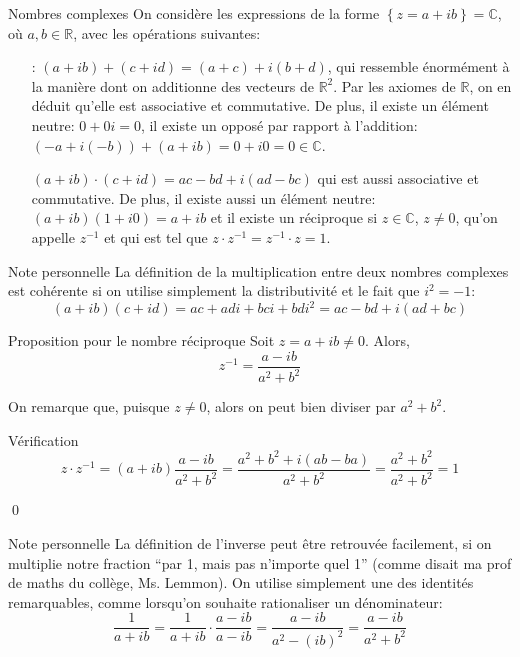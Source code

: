 \documentclass{article}
\begin{document}
\begin{parag}{Nombres complexes}
    On considère les expressions de la forme $\left\{z = a + ib\right\} = \mathbb{C}$, où $a, b \in \mathbb{R}$, avec les opérations suivantes:
    \begin{itemize}
        \item[\important{+} :] $\left(a + ib\right) + \left(c + id\right) = \left(a + c\right) + i\left(b + d\right)$, qui ressemble énormément à la manière dont on additionne des vecteurs de $\mathbb{R}^2$. Par les axiomes de $\mathbb{R}$, on en déduit qu'elle est associative et commutative. De plus, il existe un élément neutre: $0 + 0i = 0$, il existe un opposé par rapport à l'addition: $\left(-a + i\left(-b\right)\right) + \left(a + ib\right) = 0 + i0 = 0 \in \mathbb{C}$.
        \item[\important{$\cdot$ :}] $\left(a + ib\right) \cdot \left(c + id\right) = ac - bd + i\left(ad - bc\right)$ qui est aussi associative et commutative. De plus, il existe aussi un élément neutre: $\left(a + ib\right)\left(1 + i0\right) = a + ib$ et il existe un réciproque si $z \in \mathbb{C}$, $z \neq 0$, qu'on appelle $z^{-1}$ et qui est tel que $z\cdot z^{-1} = z^{-1} \cdot z = 1$.
    \end{itemize}

    \begin{subparag}{Note personnelle}
        La définition de la multiplication entre deux nombres complexes est cohérente si on utilise simplement la distributivité et le fait que $i^2 = -1$:
        \[\left(a + ib\right)\left(c + id\right) = ac + adi + bci + bdi^2 = ac - bd + i\left(ad + bc\right)\]
    \end{subparag}
\end{parag}

\begin{parag}{Proposition pour le nombre réciproque}
    Soit $z = a + ib \neq 0$. Alors,
    \[z^{-1} = \frac{a - ib}{a^2 + b^2}\]

    On remarque que, puisque $z \neq 0$, alors on peut bien diviser par $a^2 + b^2$.

    \begin{subparag}{Vérification}
        \[z\cdot z^{-1} = \left(a + ib\right) \frac{a - ib}{a^2 + b^2} = \frac{a^2 + b^2 + i\left(ab - ba\right)}{a^2 + b^2} = \frac{a^2 + b^2}{a^2 + b^2} = 1\]

        \qed
    \end{subparag}

    \begin{subparag}{Note personnelle}
        La définition de l'inverse peut être retrouvée facilement, si on multiplie notre fraction ``par 1, mais pas n'importe quel 1'' (comme disait ma prof de maths du collège, Ms. Lemmon). On utilise simplement une des identités remarquables, comme lorsqu'on souhaite rationaliser un dénominateur:
        \[\frac{1}{a + ib} = \frac{1}{a + ib} \cdot \frac{a - ib}{a - ib} = \frac{a - ib}{a^2 - \left(ib\right)^2} = \frac{a - ib}{a^2 + b^2}\]
    \end{subparag}
\end{parag}
\end{document}
